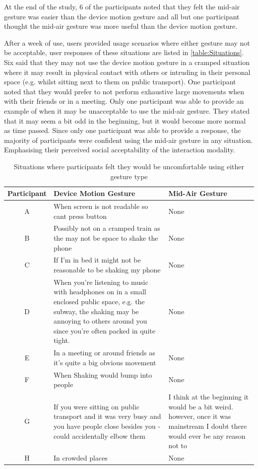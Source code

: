 \documentclass{l4proj}
\begin{document}
At the end of the study, 6 of the participants noted that they felt the mid-air gesture was easier than the device motion gesture and all but one participant thought the mid-air gesture was more useful than the device motion gesture.

After a week of use, users provided usage scenarios where either gesture may not be acceptable, user responses of these situations are listed in \autoref{table:Situations}. Six said that they may not use the device motion gesture in a cramped situation where it may result in physical contact with others or intruding in their personal space (e.g. whilst sitting next to them on public transport). One participant noted that they would prefer to not perform exhaustive large movements when with their friends or in a meeting. Only one participant was able to provide an example of when it may be unacceptable to use the mid-air gesture. They stated that it may seem a bit odd in the beginning, but it would become more normal as time passed. Since only one participant was able to provide a response, the majority of participants were confident using the mid-air gesture in any situation. Emphasising their perceived social acceptability of the interaction modality.

\begin{table}[h!]
    \centering
    \begin{tabular}{ | c | m{5cm} | m{5cm} | }
	    \hline
	    Participant & Device Motion Gesture & Mid-Air Gesture\\
	    \hline
        A & When screen is not readable so cant press button & None\\
	    \hline
        B & Possibly not on a cramped train as the may not be space to shake the phone & None\\
	    \hline
	    C & If I'm in bed it might not be reasonable to be shaking my phone & None\\
	    \hline
	    D & When you're listening to music with headphones on in a small enclosed public space, e.g. the subway, the shaking may be annoying to others around you since you're often packed in quite tight. & None\\
	    \hline
	    E & In a meeting or around friends as it's quite a big obvious movement & None\\
	    \hline
	    F & When Shaking would bump into people & None\\
	    \hline
	    G & If you were sitting on public transport and it was very busy and you have people close besides you - could accidentally elbow them & I think at the beginning it would be a bit weird. however, once it was mainstream I doubt there would ever be any reason not to\\
	    \hline
	    H & In crowded places & None\\
	    \hline
    \end{tabular}
    \caption{Situations where participants felt they would be uncomfortable using either gesture type}
    \label{table:Situations}
\end{table}
\end{document}
